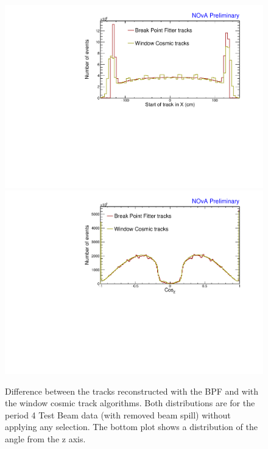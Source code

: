 \begin{enumerate}
\begin{enumerate}
\begin{figure}[!ht]
\includegraphics[width=\textwidth]{Plots/TBCalibration/DBSim_TrackAlgComparison_StartX.pdf}
\includegraphics[width=\textwidth]{Plots/TBCalibration/DBSim_TrackAlgComparison_CosZ.pdf}
\caption[Tracking algorithms for the data-based simulation selection]{Difference between the tracks reconstructed with the \acrshort{BPF} and with the window cosmic track algorithms. Both distributions are for the period 4 Test Beam data (with removed beam spill) without applying any selection. The bottom plot shows a distribution of the angle from the z axis.}
\label{fig:DataBasedSimTrackComparison}
\end{figure}


\end{enumerate}
\end{enumerate}

